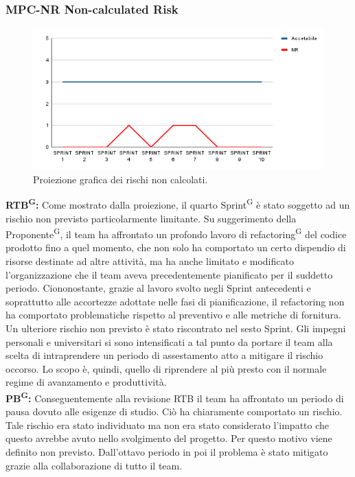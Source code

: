 \documentclass[8pt]{article}
\newcommand{\glossterm}[1]{#1\textsuperscript{G}} %
\begin{document}
\subsubsection{MPC-NR Non-calculated Risk}
\begin{figure}[h!]
    \centering
    \includegraphics[width=1\textwidth]{images_pdq/NR.png}
    \caption{Proiezione grafica dei rischi non calcolati.}
    \label{fig:Proiezione grafica dei rischi non calcolati}
\end{figure}
\textbf{\glossterm{RTB}:} Come mostrato dalla proiezione, il quarto \glossterm{Sprint} è stato soggetto ad un rischio non previsto particolarmente limitante. Su suggerimento della \glossterm{Proponente}, il team ha affrontato un profondo lavoro di \glossterm{refactoring} del codice prodotto fino a quel momento, che non solo ha comportato un certo dispendio di risorse destinate ad altre attività, ma ha anche limitato e modificato l'organizzazione che il team aveva precedentemente pianificato per il suddetto periodo. Ciononostante, grazie al lavoro svolto negli Sprint antecedenti e soprattutto alle accortezze adottate nelle fasi di pianificazione, il refactoring non ha comportato problematiche rispetto al preventivo e alle metriche di fornitura.\\
Un ulteriore rischio non previsto è stato riscontrato nel sesto Sprint. Gli impegni personali e universitari si sono intensificati a tal punto da portare il team alla scelta di intraprendere un periodo di assestamento atto a mitigare il rischio occorso. Lo scopo è, quindi, quello di riprendere al più presto con il normale regime di avanzamento e produttività.\\
\textbf{\glossterm{PB}:} Conseguentemente alla revisione RTB il team ha affrontato un periodo di pausa dovuto alle esigenze di studio. Ciò ha chiaramente comportato un rischio. Tale rischio era stato individuato ma non era stato considerato l'impatto che questo avrebbe avuto nello svolgimento del progetto. Per questo motivo viene definito non previsto. Dall'ottavo periodo in poi il problema è stato mitigato grazie alla collaborazione di tutto il team.
\clearpage
\end{document}
